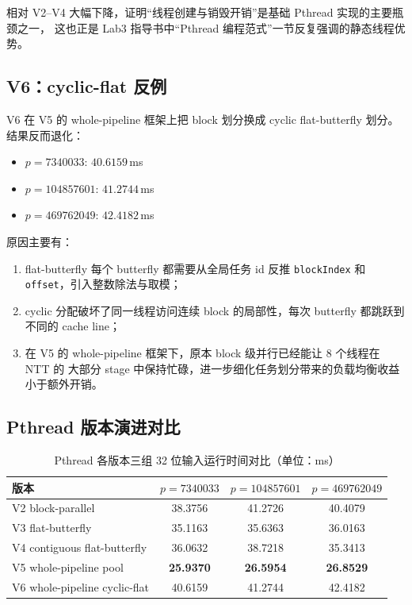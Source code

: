 \documentclass[UTF8,a4paper,10pt]{ctexart}
\begin{document}
相对 V2--V4 大幅下降，证明``线程创建与销毁开销''是基础 Pthread 实现的主要瓶颈之一，
这也正是 Lab3 指导书中``Pthread 编程范式''一节反复强调的静态线程优势\cite{butenhof1997programming}。

\subsection{V6：cyclic-flat 反例}

V6 在 V5 的 whole-pipeline 框架上把 block 划分换成 cyclic flat-butterfly 划分。结果反而退化：

\begin{itemize}
  \item $p = 7340033$: $40.6159$\,ms
  \item $p = 104857601$: $41.2744$\,ms
  \item $p = 469762049$: $42.4182$\,ms
\end{itemize}

原因主要有：

\begin{enumerate}
  \item flat-butterfly 每个 butterfly 都需要从全局任务 id 反推 \texttt{blockIndex}
        和 \texttt{offset}，引入整数除法与取模；
  \item cyclic 分配破坏了同一线程访问连续 block 的局部性，每次 butterfly 都跳跃到
        不同的 cache line；
  \item 在 V5 的 whole-pipeline 框架下，原本 block 级并行已经能让 8 个线程在 NTT 的
        大部分 stage 中保持忙碌，进一步细化任务划分带来的负载均衡收益小于额外开销。
\end{enumerate}

\subsection{Pthread 版本演进对比}

\begin{table}[H]
  \centering
  \begin{tabular}{lccc}
  \toprule  
  \textbf{版本} & $p=7340033$ & $p=104857601$ & $p=469762049$ \\
  \midrule
  V2 block-parallel             & 38.3756          & 41.2726          & 40.4079          \\
  V3 flat-butterfly             & 35.1163          & 35.6363          & 36.0163          \\
  V4 contiguous flat-butterfly  & 36.0632          & 38.7218          & 35.3413          \\
  V5 whole-pipeline pool        & \textbf{25.9370} & \textbf{26.5954} & \textbf{26.8529} \\
  V6 whole-pipeline cyclic-flat & 40.6159          & 41.2744          & 42.4182          \\
  \bottomrule
  \end{tabular}
  \caption{Pthread 各版本三组 32 位输入运行时间对比（单位：ms）}
  \label{tab:pthread-versions}
\end{table}
\end{document}
